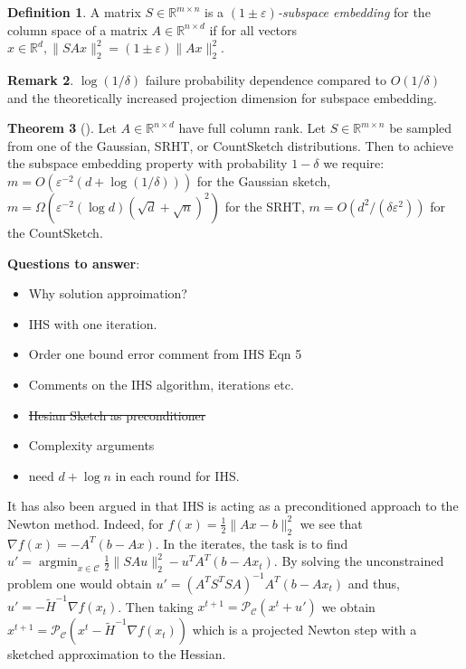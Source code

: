 \documentclass[twoside]{article}
\newcommand{\R}{\mathbb{R}}
\newcommand{\eps}{\varepsilon}
\theoremstyle{definition}\newtheorem{thm}{Theorem}[section]
\theoremstyle{definition}\newtheorem{mydef}[thm]{Definition}
\theoremstyle{definition}\newtheorem{rem}[thm]{Remark}
\theoremstyle{definition}\newtheorem{prop}[thm]{Proposition}
\theoremstyle{definition}\newtheorem{example}[thm]{Example}
\theoremstyle{definition}\newtheorem{claim}[thm]{Claim}
\theoremstyle{definition}\newtheorem{Qu}[thm]{Question}
\theoremstyle{definition}\newtheorem{Lemma}[thm]{Lemma}
\theoremstyle{definition}\newtheorem{Cor}[thm]{Corollary}
\theoremstyle{definition}\newtheorem{Fact}[]{Fact}
\DeclareMathOperator*{\argmin}{argmin}
\begin{document}
\begin{mydef} \label{def: subspace-embedding}
  A matrix $S \in \R^{m \times n}$ is a \textit{$(1 \pm \eps)$-subspace embedding}
  for the column space of a matrix $A \in \R^{n \times d}$ if for all vectors
  $x \in \R^d, \|SAx\|_2^2 = (1 \pm \eps)\|Ax\|_2^2$.
\end{mydef}

\begin{rem} \label{rem: subspace-embedding-remark}
  $\log(1/\delta)$ failure probability dependence compared to $O(1/\delta)$
  and the theoretically increased projection dimension for subspace embedding.
\end{rem}



\begin{thm}[\cite{woodruff2014sketching}] \label{thm: subspace-embedding-dims}
  Let $A \in \R^{n \times d}$ have full column rank.
  Let $S \in \R^{m \times n}$ be sampled from one of the Gaussian, SRHT, or
  CountSketch distributions.
  Then to achieve the subspace embedding property with probability
  $1 - \delta$ we require:
  $m = O(\eps^{-2}(d + \log(1/\delta)))$ for the Gaussian sketch,
  $m = \Omega(\eps^{-2}(\log d) (\sqrt{d} + \sqrt{n})^2)$ for the SRHT,
  $m = O(d^2/(\delta \eps^2))$ for the CountSketch.
\end{thm}



\textbf{Questions to answer}:
\begin{itemize}
  \item Why solution approimation?
  \item IHS with one iteration.
  \item Order one bound error comment from IHS Eqn 5
  \item Comments on the IHS algorithm, iterations etc.
  \item \sout{Hesian Sketch as preconditioner}
  \item Complexity arguments
  \item need $d + \log n$ in each round for IHS.
\end{itemize}

\color{red}
It has also been argued in \cite{wang2017sketching} that IHS is acting as
a preconditioned approach to the Newton method.
Indeed, for $f(x) = \frac{1}{2} \|Ax-b\|_2^2$ we see that $\nabla f(x) =
-A^T(b-Ax)$.
In the iterates, the task is to find $u' = \argmin_{x \in \mathcal{C}}
\frac{1}{2}\|SAu\|_2^2 - u^TA^T(b-Ax_t)$.
By solving the unconstrained problem one would obtain $u' = (A^TS^TSA)^{-1}
A^T(b-Ax_t)$ and thus, $u' = - \tilde{H}^{-1} \nabla f(x_t)$.
Then taking $x^{t+1} = \mathcal{P}_{\mathcal{C}} (x^t + u')$ we obtain
$x^{t+1} = \mathcal{P}_{\mathcal{C}} (x^t - \tilde{H}^{-1}\nabla f(x_t))$
which is a projected Newton step with a sketched approximation to
the Hessian.
\color{black}
\end{document}
